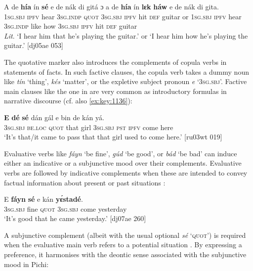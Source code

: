 \ea%
    \label{ex:key:1408}
    \gll \MakeUppercase{A}   de  \textbf{hía}    ín    \textbf{sé}    e    de  nák  di  gitá    ɔ 
a    de  \textbf{hía}    ín    \textbf{lɛk}  \textbf{háw}    e    de  nák  di  gita. \\
\textsc{1sg.sbj}  \textsc{ipfv}  hear    \textsc{3sg.indp}  \textsc{quot}    \textsc{3sg.sbj}  \textsc{ipfv} hit  \textsc{def}  guitar  or
\textsc{1sg.sbj}  \textsc{ipfv}  hear    \textsc{3sg.indp}  like  how    \textsc{3sg.sbj}  \textsc{ipfv} hit  \textsc{def}  guitar\\

\glt 
\textit{Lit}. ‘I hear him that he’s playing the guitar.’ or ‘I hear him how he’s playing 
the guitar.’ [dj05ae 053]
\z

The quotative marker also introduces the complements of copula verbs in statements of facts. In such factive clauses, the copula verb takes a dummy noun like \textit{tín} ‘thing’, \textit{kés} ‘matter’, or the expletive subject pronoun \textit{e} ‘\textsc{3sg.sbj}’. Factive main clauses like the one in  are very common as introductory formulas in narrative discourse (cf. also \ref{ex:key:1136}): 


\ea%
    \label{ex:key:1409}
    \gll \textbf{E}    \textbf{dé}    \textbf{sé}    dán    gál    e    bin  de  kán    yá.\\
\textsc{3sg.sbj}  \textsc{be.loc}  \textsc{quot}    that    girl    \textsc{3sg.sbj}  \textsc{pst}  \textsc{ipfv}  come  here\\

\glt ‘It’s that/it came to pass that that girl used to come here.’ [ru03wt 019]
\z

Evaluative verbs like \textit{fáyn} ‘be fine’, \textit{gúd} ‘be good’, or \textit{bád} ‘be bad’ can induce either an indicative or a subjunctive mood over their complements. Evaluative verbs are followed by indicative complements when these are intended to convey factual information about present or past situations : 


\ea%
    \label{ex:key:1410}
    \gll E    \textbf{fáyn}  \textbf{sé}    e    kán    \textbf{yɛ́stadé}.\\
\textsc{3sg.sbj}  fine    \textsc{quot}    \textsc{3sg.sbj}  come  yesterday\\

\glt ‘It’s good that he came yesterday.’ [dj07ae 260]
\z

A subjunctive complement (albeit with the usual optional \textit{sé} ‘\textsc{quot}’) is required when the evaluative main verb refers to a potential situation . By expressing a preference, it harmonises with the deontic sense associated with the subjunctive mood in Pichi:


